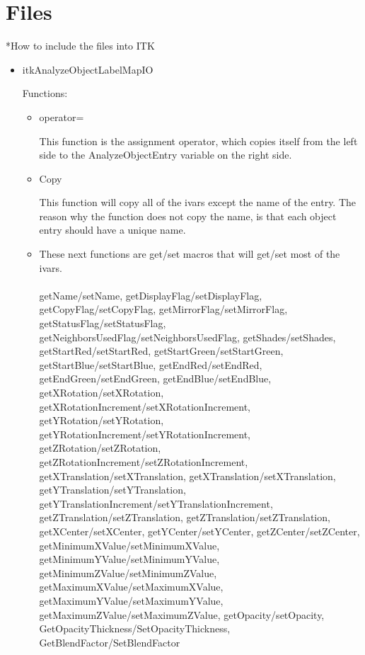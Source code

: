 \documentclass{InsightArticle}
\begin{document}
\section{Files}

*How to include the files into ITK
\begin{itemize}
\item itkAnalyzeObjectLabelMapIO

Functions:
\begin{itemize}
        \item operator=

        This function is the assignment operator, which copies itself from the left side to the AnalyzeObjectEntry variable on the right side.
        
       
      \item Copy
       
      This function will copy all of the ivars except the name of the entry.  The reason why the function does not copy the name, is that each object entry should have a unique name.

      \item These next functions are get/set macros that will get/set most of the ivars.\\ \\

         getName/setName, getDisplayFlag/setDisplayFlag, getCopyFlag/setCopyFlag, getMirrorFlag/setMirrorFlag, getStatusFlag/setStatusFlag, getNeighborsUsedFlag/setNeighborsUsedFlag, getShades/setShades, getStartRed/setStartRed, getStartGreen/setStartGreen, getStartBlue/setStartBlue, getEndRed/setEndRed, getEndGreen/setEndGreen, getEndBlue/setEndBlue, getXRotation/setXRotation, getXRotationIncrement/setXRotationIncrement, getYRotation/setYRotation, getYRotationIncrement/setYRotationIncrement, getZRotation/setZRotation, getZRotationIncrement/setZRotationIncrement, getXTranslation/setXTranslation, getXTranslation/setXTranslation, getYTranslation/setYTranslation, getYTranslationIncrement/setYTranslationIncrement, getZTranslation/setZTranslation, getZTranslation/setZTranslation, getXCenter/setXCenter, getYCenter/setYCenter, getZCenter/setZCenter, getMinimumXValue/setMinimumXValue, getMinimumYValue/setMinimumYValue, getMinimumZValue/setMinimumZValue, getMaximumXValue/setMaximumXValue, getMaximumYValue/setMaximumYValue, getMaximumZValue/setMaximumZValue, getOpacity/setOpacity,   GetOpacityThickness/SetOpacityThickness, GetBlendFactor/SetBlendFactor\\ \\


\end{itemize}
\end{itemize}
\end{document}
